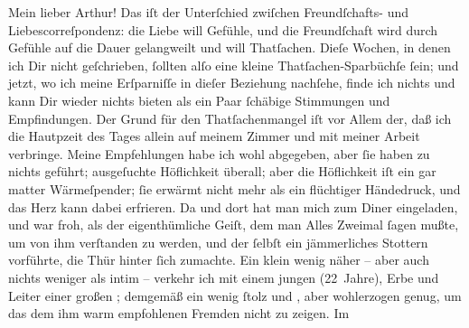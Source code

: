 \pstart\center{}Mein lieber Arthur!\pend\vspace{0.5em}
\pstart
           Das iſt der Unterſchied zwiſchen Freundſchafts- und Liebescorreſpondenz: die Liebe
               will Gefühle, und die Freundſchaft wird durch Gefühle auf die Dauer gelangweilt und
               will Thatſachen. Dieſe Wochen, in denen ich Dir nicht geſchrieben,{ }ſollten alſo eine
               kleine Thatſachen-Sparbüchſe{ }ſein; und jetzt, wo ich meine Erſparniſſe in dieſer
               Beziehung nachſehe, finde ich nichts und kann Dir wieder nichts bieten als ein Paar{ }ſchäbige Stimmungen und Empfindungen. Der Grund für den Thatſachenmangel iſt vor
               Allem der, daß ich die Hautpzeit des Tages allein auf meinem Zimmer und mit meiner
               Arbeit verbringe. Meine Empfehlungen habe ich wohl abgegeben, aber{ }ſie haben zu
               nichts geführt; ausgeſuchte Höflichkeit überall; aber die Höflichkeit iſt ein gar
               matter Wärmeſpender;{ }ſie erwärmt nicht mehr als ein flüchtiger Händedruck, und das
               Herz kann dabei erfrieren. Da und dort hat man mich zum Diner eingeladen, und war
               froh, als der eigenthümliche Geiſt, dem man Alles Zweimal{ }ſagen mußte, um von ihm
               verſtanden zu werden, und der{ }ſelbſt ein jämmerliches Stottern vorführte, die {\pb}Thür hinter{ }ſich zumachte. Ein klein wenig näher –
               aber auch nichts weniger als intim – verkehr ich mit einem jungen \label{K_L02664-1v}\label{K_L02664-1} (22 Jahre),
                  Erbe und Leiter einer großen \label{K_L02664-2v}\label{K_L02664-2}; demgemäß ein
               wenig{ }ſtolz und \label{K_L02664-3v}\label{K_L02664-3},
               aber wohlerzogen genug, um das dem ihm warm empfohlenen Fremden nicht zu zeigen. Im

